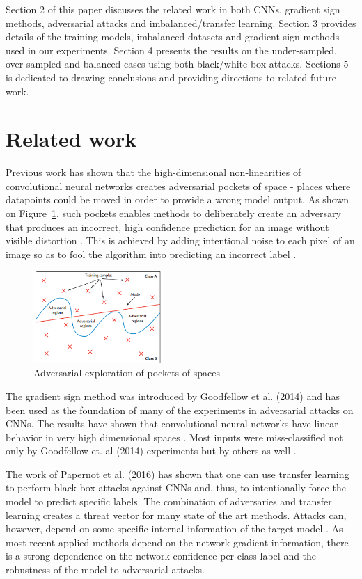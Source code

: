 \documentclass[runningheads,a4paper]{llncs}
\begin{document}
Section 2 of this paper discusses the related work in both CNNs, gradient sign methods, adversarial attacks and imbalanced/transfer learning. Section 3 provides details of the training models, imbalanced datasets and gradient sign methods used in our experiments. Section 4 presents the results on the under-sampled, over-sampled and balanced cases using both black/white-box attacks. Sections 5 is dedicated to drawing conclusions and providing directions to related future work.
\section{Related work}


Previous work has shown that the high-dimensional non-linearities of convolutional neural networks \cite{lawrence1997face} creates adversarial pockets of space - places where datapoints could be moved in order to provide a wrong model output. As shown on Figure~\ref{fig:adv_space}, such pockets enables methods to deliberately create an adversary that produces an incorrect, high confidence prediction for an image without visible distortion \cite{papernot_thesis_2016}. This is achieved by adding intentional noise to each pixel of an image so as to fool the algorithm into predicting an incorrect label \cite{goodfellow2014,papernot2016transf,szegedy2013}.

\begin{figure}
	\centering
	\includegraphics[height=3.5cm]{adv_space.png}
	\caption{Adversarial exploration of pockets of spaces \cite{papernot_2017}}
	\label{fig:adv_space}
\end{figure}

The gradient sign method was introduced by Goodfellow et al. (2014) and has been used as the foundation of many of the experiments in adversarial attacks on CNNs. The results have shown that convolutional neural networks have linear behavior in very high dimensional spaces \cite{goodfellow2014}.  Most inputs were miss-classified not only by Goodfellow et. al (2014) experiments but by others as well \cite{billovits,papernot2016}.

The work of Papernot et al. (2016) has shown that one can use transfer learning to perform black-box attacks against CNNs \cite{papernot2016transf,yosinski2014transferable} and, thus, to intentionally force the model to predict specific labels. The combination of adversaries and transfer learning creates a threat vector for many state of the art methods. Attacks can, however, depend on some specific internal information of the target model \cite{lowd2005,papernot2016transf}. As most recent applied methods depend on the network gradient information, there is a strong dependence on the network confidence per class label and the robustness of the model to adversarial attacks.
\end{document}
